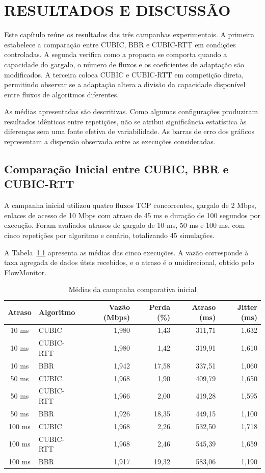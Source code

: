\chapter{RESULTADOS E DISCUSSÃO}
\label{cap:resultados}

Este capítulo reúne os resultados das três campanhas experimentais. A primeira estabelece a comparação entre CUBIC, BBR e CUBIC-RTT em condições controladas. A segunda verifica como a proposta se comporta quando a capacidade do gargalo, o número de fluxos e os coeficientes de adaptação são modificados. A terceira coloca CUBIC e CUBIC-RTT em competição direta, permitindo observar se a adaptação altera a divisão da capacidade disponível entre fluxos de algoritmos diferentes.

As médias apresentadas são descritivas. Como algumas configurações produziram resultados idênticos entre repetições, não se atribui significância estatística às diferenças sem uma fonte efetiva de variabilidade. As barras de erro dos gráficos representam a dispersão observada entre as execuções consideradas.

\section{Comparação Inicial entre CUBIC, BBR e CUBIC-RTT}

A campanha inicial utilizou quatro fluxos TCP concorrentes, gargalo de 2 Mbps, enlaces de acesso de 10 Mbps com atraso de 45 ms e duração de 100 segundos por execução. Foram avaliados atrasos de gargalo de 10 ms, 50 ms e 100 ms, com cinco repetições por algoritmo e cenário, totalizando 45 simulações.

A Tabela~\ref{tab:resultados-iniciais} apresenta as médias das cinco execuções. A vazão corresponde à taxa agregada de dados úteis recebidos, e o atraso é o unidirecional, obtido pelo FlowMonitor.

\begin{table}[htbp]
\centering
\caption{Médias da campanha comparativa inicial}
\label{tab:resultados-iniciais}
\small
\begin{tabular}{c l r r r r}
\toprule
\textbf{Atraso} & \textbf{Algoritmo} & \textbf{Vazão (Mbps)} & \textbf{Perda (\%)} & \textbf{Atraso (ms)} & \textbf{Jitter (ms)} \\
\midrule
10 ms & CUBIC & 1,980 & 1,43 & 311,71 & 1,632 \\
10 ms & CUBIC-RTT & 1,980 & 1,42 & 319,91 & 1,610 \\
10 ms & BBR & 1,942 & 17,58 & 337,51 & 1,060 \\
\midrule
50 ms & CUBIC & 1,968 & 1,90 & 409,79 & 1,650 \\
50 ms & CUBIC-RTT & 1,966 & 2,00 & 419,28 & 1,595 \\
50 ms & BBR & 1,926 & 18,35 & 449,15 & 1,100 \\
\midrule
100 ms & CUBIC & 1,968 & 2,26 & 532,50 & 1,718 \\
100 ms & CUBIC-RTT & 1,968 & 2,46 & 545,39 & 1,659 \\
100 ms & BBR & 1,917 & 19,32 & 583,06 & 1,190 \\
\bottomrule
\end{tabular}
\end{table}

